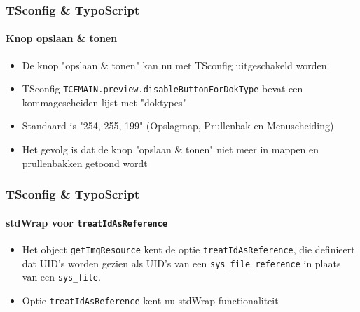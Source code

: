 \begin{frame}[fragile]
	\frametitle{TSconfig \& TypoScript}
	\framesubtitle{Knop opslaan \& tonen}

	\begin{itemize}

		\item De knop "opslaan \& tonen" kan nu met TSconfig uitgeschakeld worden

		\item TSconfig \texttt{TCEMAIN.preview.disableButtonForDokType} bevat een kommagescheiden lijst met "doktypes"

		\item Standaard is "254, 255, 199" (Opslagmap, Prullenbak en Menuscheiding)

		\item Het gevolg is dat de knop "opslaan \& tonen" niet meer in mappen en prullenbakken getoond wordt

	\end{itemize}

\end{frame}

\begin{frame}[fragile]
	\frametitle{TSconfig \& TypoScript}
	\framesubtitle{stdWrap voor \texttt{treatIdAsReference}}

	\begin{itemize}

		\item Het object \texttt{getImgResource} kent de optie \texttt{treatIdAsReference},
			die definieert dat UID's worden gezien als UID's van een \texttt{sys\_file\_reference}
			in plaats van een \texttt{sys\_file}.

		\item Optie \texttt{treatIdAsReference} kent nu stdWrap functionaliteit

	\end{itemize}

\end{frame}

